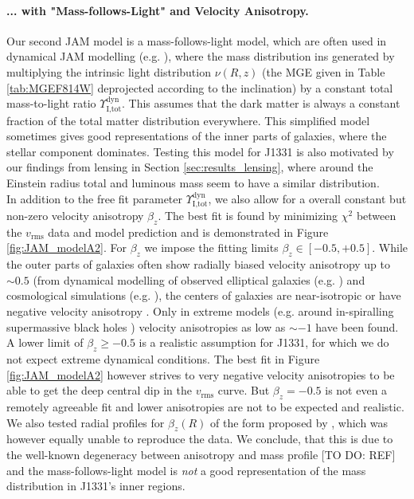 \paragraph{... with "Mass-follows-Light" and Velocity Anisotropy.} Our second JAM model is a mass-follows-light model, which are often used in dynamical JAM modelling (e.g. \citet{GlennEC,Cap06}), where the mass distribution ins generated by multiplying the intrinsic light distribution $\nu(R,z)$ (the MGE given in Table \ref{tab:MGEF814W} deprojected according to the inclination) by a constant total mass-to-light ratio  $\Upsilon_\text{I,tot}^\text{dyn}$. This assumes that the dark matter is always a constant fraction of the total matter distribution everywhere. This simplified model sometimes gives good representations of the inner parts of galaxies, where the stellar component dominates. Testing this model for J1331 is also motivated by our findings from lensing in Section \ref{sec:results_lensing}, where around the Einstein radius total and luminous mass seem to have a similar distribution.
\\In addition to the free fit parameter  $\Upsilon_\text{I,tot}^\text{dyn}$, we also allow for a overall constant but non-zero velocity anisotropy $\beta_z$. The best fit is found by minimizing $\chi^2$ between the $v_\text{rms}$ data and model prediction and is demonstrated in Figure \ref{fig:JAM_modelA2}. For $\beta_z$ we impose the fitting limits $\beta_z \in [-0.5,+0.5]$. While the outer parts of galaxies often show radially biased velocity anisotropy up to $\sim 0.5$ (from dynamical modelling of observed elliptical galaxies (e.g. \citet{Kronawitter2000}) and cosmological simulations (e.g. \citet{2004MNRAS.352..535D,2001ApJ...557..533F}), the centers of galaxies are near-isotropic or have  negative velocity anisotropy \citep{2003ApJ...583...92G}. Only in extreme models (e.g. around in-spiralling supermassive black holes \citep{1997NewA....2..533Q}) velocity anisotropies as low as $\sim -1$ have been found. A lower limit of $\beta_z \geq -0.5$ is a realistic assumption for J1331, for which we do not expect extreme dynamical conditions. The best fit in Figure \ref{fig:JAM_modelA2} however strives to very negative velocity anisotropies to be able to get the deep central dip in the  $v_\text{rms}$ curve. But $\beta_z = -0.5$ is not even a remotely agreeable fit and lower anisotropies are not to be expected and realistic. We also tested radial profiles for $\beta_z(R)$ of the form proposed by \citet{BaesVanHese}, which was however equally unable to reproduce the data. We conclude, that this is due to the well-known degeneracy between anisotropy and mass profile [TO DO: REF] and the mass-follows-light model is \emph{not} a good representation of the mass distribution in J1331's inner regions.


